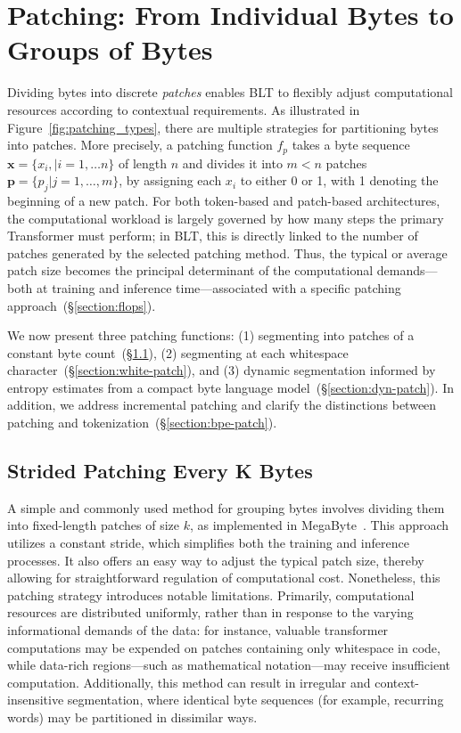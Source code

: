\section{Patching: From Individual Bytes to Groups of Bytes}
\label{section:patching}

Dividing bytes into discrete \textit{patches} enables {\textsc BLT} to flexibly adjust computational resources according to contextual requirements. As illustrated in Figure~\ref{fig:patching_types}, there are multiple strategies for partitioning bytes into patches. More precisely, a patching function $f_p$ takes a byte sequence $\pmb{x}=\{x_i,|i=1,\ldots n\}$ of length $n$ and divides it into $m < n$ patches $\pmb{p}=\{p_j|j=1,\ldots,m\}$, by assigning each $x_i$ to either 0 or 1, with 1 denoting the beginning of a new patch. For both token-based and patch-based architectures, the computational workload is largely governed by how many steps the primary Transformer must perform; in {\textsc BLT}, this is directly linked to the number of patches generated by the selected patching method. Thus, the typical or average patch size becomes the principal determinant of the computational demands—both at training and inference time—associated with a specific patching approach~(\S\ref{section:flops}).

We now present three patching functions: (1) segmenting into patches of a constant byte count~(\S\ref{section:static-patch}), (2) segmenting at each whitespace character~(\S\ref{section:white-patch}), and (3) dynamic segmentation informed by entropy estimates from a compact byte language model~(\S\ref{section:dyn-patch}). In addition, we address incremental patching and clarify the distinctions between patching and tokenization~(\S\ref{section:bpe-patch}).

\subsection{Strided Patching Every K Bytes}
\label{section:static-patch}

A simple and commonly used method for grouping bytes involves dividing them into fixed-length patches of size $k$, as implemented in MegaByte~\citep{yu2023megabyte}. This approach utilizes a constant stride, which simplifies both the training and inference processes. It also offers an easy way to adjust the typical patch size, thereby allowing for straightforward regulation of computational cost. Nonetheless, this patching strategy introduces notable limitations. Primarily, computational resources are distributed uniformly, rather than in response to the varying informational demands of the data: for instance, valuable transformer computations may be expended on patches containing only whitespace in code, while data-rich regions—such as mathematical notation—may receive insufficient computation. Additionally, this method can result in irregular and context-insensitive segmentation, where identical byte sequences (for example, recurring words) may be partitioned in dissimilar ways.

